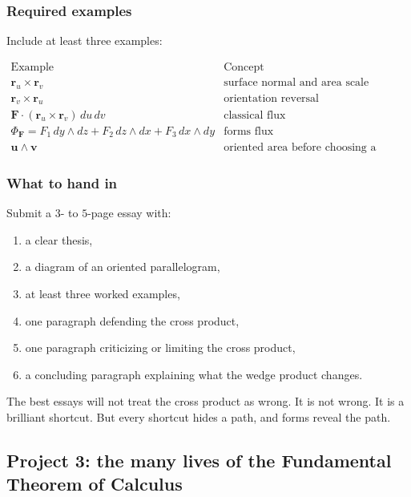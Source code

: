 \subsubsection*{Required examples}

Include at least three examples:

\[
\begin{array}{c|c}
\text{Example} & \text{Concept} \\ \hline
\mathbf r_u\times\mathbf r_v & \text{surface normal and area scale}\\[1mm]
\mathbf r_v\times\mathbf r_u & \text{orientation reversal}\\[1mm]
\mathbf F\cdot(\mathbf r_u\times\mathbf r_v)\,du\,dv
&
\text{classical flux}\\[1mm]
\Phi_{\mathbf F}=
F_1\,dy\wedge dz+F_2\,dz\wedge dx+F_3\,dx\wedge dy
&
\text{forms flux}\\[1mm]
\mathbf u\wedge\mathbf v
&
\text{oriented area before choosing a normal}
\end{array}
\]

\subsubsection*{What to hand in}

Submit a \(3\)- to \(5\)-page essay with:

\begin{enumerate}
\item a clear thesis,

\item a diagram of an oriented parallelogram,

\item at least three worked examples,

\item one paragraph defending the cross product,

\item one paragraph criticizing or limiting the cross product,

\item a concluding paragraph explaining what the wedge product changes.
\end{enumerate}

The best essays will not treat the cross product as wrong.  It is not wrong.  It is a
brilliant shortcut.  But every shortcut hides a path, and forms reveal the path.

\subsection{Project 3: the many lives of the Fundamental Theorem of Calculus}

